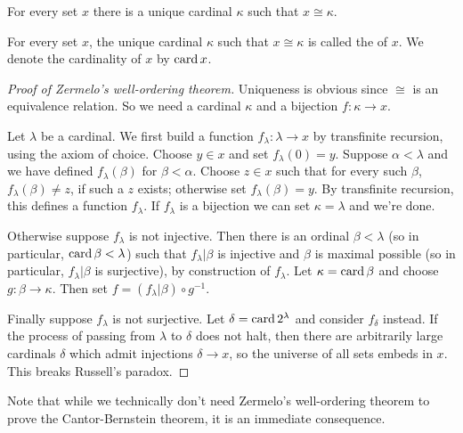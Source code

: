 \begin{theorem}\label{well-ordering theorem}
For every set $x$ there is a unique cardinal $\kappa$ such that $x \cong \kappa$.
\end{theorem}

\begin{definition}
For every set $x$, the unique cardinal $\kappa$ such that $x \cong \kappa$ is called the  of $x$.
We denote the cardinality of $x$ by $\operatorname{card} x$.
\end{definition}

\begin{proof}[Proof of Zermelo's well-ordering theorem]
Uniqueness is obvious since $\cong$ is an equivalence relation.
So we need a cardinal $\kappa$ and a bijection $f: \kappa \to x$.

Let $\lambda$ be a cardinal. We first build a function $f_\lambda: \lambda \to x$ by transfinite recursion, using the axiom of choice.
Choose $y \in x$ and set $f_\lambda(0) = y$.
Suppose $\alpha < \lambda$ and we have defined $f_\lambda(\beta)$ for $\beta < \alpha$.
Choose $z \in x$ such that for every such $\beta$, $f_\lambda(\beta) \neq z$, if such a $z$ exists; otherwise set $f_\lambda(\beta) = y$.
By transfinite recursion, this defines a function $f_\lambda$. If $f_\lambda$ is a bijection we can set $\kappa = \lambda$ and we're done.

Otherwise suppose $f_\lambda$ is not injective. Then there is an ordinal $\beta < \lambda$ (so in particular, $\operatorname{card} \beta < \lambda$) such that $f_\lambda|\beta$ is injective and $\beta$ is maximal possible (so in particular, $f_\lambda|\beta$ is surjective), by construction of $f_\lambda$.
Let $\kappa = \operatorname{card} \beta$ and choose $g: \beta \to \kappa$.
Then set $f = (f_\lambda|\beta) \circ g^{-1}$.

Finally suppose $f_\lambda$ is not surjective. Let $\delta = \operatorname{card} 2^\lambda$ and consider $f_\delta$ instead.
If the process of passing from $\lambda$ to $\delta$ does not halt, then there are arbitrarily large cardinals $\delta$ which admit injections $\delta \to x$, so the universe of all sets embeds in $x$.
This breaks Russell's paradox.
\end{proof}

\begin{subsec}
Note that while we technically don't need Zermelo's well-ordering theorem to prove the Cantor-Bernstein theorem, it is an immediate consequence.
\end{subsec}

